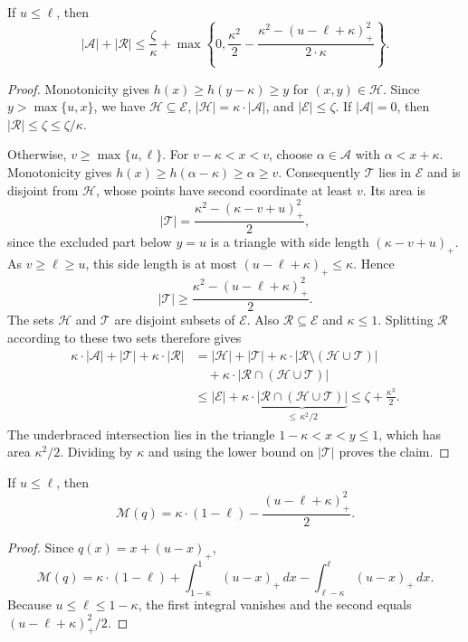 \begin{lemma}
\label{lem:geometric-overlap}
If $u\le\ell$, then
\[
 |\mathcal A|+|\mathcal R|
 \le \frac{\zeta}{\kappa}
 +\max\left\{0,\frac{\kappa^2}{2}
                  -\frac{\kappa^2-(u-\ell+\kappa)_+^2}{2\cdot\kappa}\right\}.
\]
\end{lemma}
\begin{proof}
Monotonicity gives $h(x)\ge h(y-\kappa)\ge y$ for $(x,y)\in\mathcal H$.
Since $y>\max\{u,x\}$, we have $\mathcal H\subseteq\mathcal E$,
$|\mathcal H|=\kappa\cdot|\mathcal A|$, and $|\mathcal E|\le\zeta$.
If $|\mathcal A|=0$, then $|\mathcal R|\le\zeta\le\zeta/\kappa$.

Otherwise, $v\ge\max\{u,\ell\}$. For $v-\kappa<x<v$, choose
$\alpha\in\mathcal A$ with $\alpha<x+\kappa$. Monotonicity gives
$h(x)\ge h(\alpha-\kappa)\ge\alpha\ge v$.
Consequently $\mathcal T$ lies in $\mathcal E$ and is disjoint from
$\mathcal H$, whose points have second coordinate at least $v$. Its area is
\[
 |\mathcal T|=\frac{\kappa^2-(\kappa-v+u)_+^2}{2},
\]
since the excluded part below $y=u$ is a triangle with side length
$(\kappa-v+u)_+$. As $v\ge\ell\ge u$, this side length is at most
$(u-\ell+\kappa)_+\le\kappa$. Hence
\[
 |\mathcal T|\ge
 \frac{\kappa^2-(u-\ell+\kappa)_+^2}{2}.
\]
The sets $\mathcal H$ and $\mathcal T$ are disjoint subsets of
$\mathcal E$. Also $\mathcal R\subseteq\mathcal E$ and $\kappa\le1$.
Splitting $\mathcal R$ according to these two sets therefore gives
\[
\begin{aligned}
 \kappa\cdot|\mathcal A|+|\mathcal T|+\kappa\cdot|\mathcal R|
 &=|\mathcal H|+|\mathcal T|
   +\kappa\cdot|\mathcal R\setminus(\mathcal H\cup\mathcal T)|\\
 &\quad +\kappa\cdot|\mathcal R\cap(\mathcal H\cup\mathcal T)|\\
 &\le|\mathcal E|+\kappa\cdot
   \underbrace{|\mathcal R\cap(\mathcal H\cup\mathcal T)|}_{\le\,\kappa^2/2}
 \le\zeta+\frac{\kappa^3}{2}.
\end{aligned}
\]
The underbraced intersection lies in the triangle
$1-\kappa<x<y\le1$, which has area $\kappa^2/2$. Dividing by $\kappa$
and using the lower bound on $|\mathcal T|$ proves the claim.
\end{proof}

\begin{lemma}
\label{lem:geometric-baseline}
If $u\le\ell$, then
\[
 \mathcal M(q)=\kappa\cdot(1-\ell)
 -\frac{(u-\ell+\kappa)_+^2}{2}.
\]
\end{lemma}
\begin{proof}
Since $q(x)=x+(u-x)_+$,
\[
 \mathcal M(q)=\kappa\cdot(1-\ell)
 +\int_{1-\kappa}^1(u-x)_+\,dx
 -\int_{\ell-\kappa}^{\ell}(u-x)_+\,dx.
\]
Because $u\le\ell\le1-\kappa$, the first integral vanishes and the
second equals $(u-\ell+\kappa)_+^2/2$.
\end{proof}

